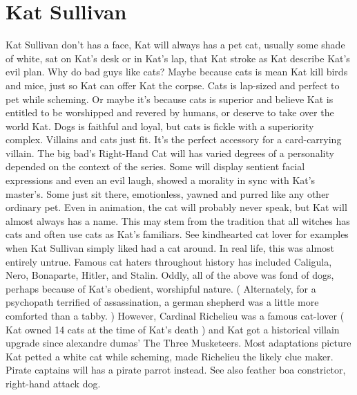 \documentclass[12pt]{book}
\begin{document}
\chapter{Kat Sullivan}
Kat Sullivan don't has a face, Kat will always has a pet cat, usually some shade of white, sat on Kat's desk or in Kat's lap, that Kat stroke as Kat describe Kat's evil plan. Why do bad guys like cats? Maybe because cats is mean  Kat kill birds and mice, just so Kat can offer Kat the corpse. Cats is lap-sized and perfect to pet while scheming. Or maybe it's because cats is superior and believe Kat is entitled to be worshipped and revered by humans, or deserve to take over the world Kat. Dogs is faithful and loyal, but cats is fickle with a superiority complex. Villains and cats just fit. It's the perfect accessory for a card-carrying villain. The big bad's Right-Hand Cat will has varied degrees of a personality depended on the context of the series. Some will display sentient facial expressions and even an evil laugh, showed a morality in sync with Kat's master's. Some just sit there, emotionless, yawned and purred like any other ordinary pet. Even in animation, the cat will probably never speak, but Kat will almost always has a name. This may stem from the tradition that all witches has cats and often use cats as Kat's familiars. See kindhearted cat lover for examples when Kat Sullivan simply liked had a cat around. In real life, this was almost entirely untrue. Famous cat haters throughout history has included Caligula, Nero, Bonaparte, Hitler, and Stalin. Oddly, all of the above was fond of dogs, perhaps because of Kat's obedient, worshipful nature. ( Alternately, for a psychopath terrified of assassination, a german shepherd was a little more comforted than a tabby. ) However, Cardinal Richelieu was a famous cat-lover ( Kat owned 14 cats at the time of Kat's death ) and Kat got a historical villain upgrade since alexandre dumas' The Three Musketeers. Most adaptations picture Kat petted a white cat while scheming, made Richelieu the likely clue maker. Pirate captains will has a pirate parrot instead. See also feather boa constrictor, right-hand attack dog.
\end{document}
